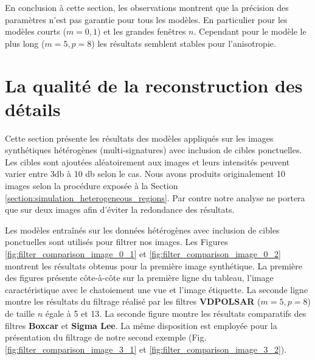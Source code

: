 En conclusion à cette section, les observations montrent que la précision des paramètres n'est pas garantie pour tous les modèles.  En particulier pour les modèles courts ($m=0,1$) et les grandes fenêtres $n$. Cependant pour le modèle le plus long ($m=5, p=8$) les résultats semblent stables pour l'anisotropie.  







\section{La qualité de la reconstruction des détails}

Cette section présente les résultats des modèles appliqués sur les images synthétiques hétérogènes (multi-signatures) avec inclusion de cibles ponctuelles. Les cibles sont ajoutées aléatoirement aux images et leurs intensités peuvent varier entre 3db à 10 db selon le cas.  Nous avons produits originalement 10 images selon la procédure exposée à la Section \ref{section:simulation_heterogeneous_regions}. Par contre notre analyse ne portera que sur deux images afin d'éviter la redondance des résultats.

Les modèles entraînés sur les données hétérogènes avec inclusion de cibles ponctuelles sont utilisés pour filtrer nos images.  Les Figures \ref{fig:filter_comparison_image_0_1} et \ref{fig:filter_comparison_image_0_2} montrent les résultats obtenus pour la première image synthétique. La première des figures présente côte-à-côte sur la première ligne du tableau, l'image caractéristique avec le chatoiement une vue et l'image étiquette.  La seconde ligne montre les résultats du filtrage réalisé par les filtres \textbf{VDPOLSAR} ($m=5, p=8$) de taille $n$ égale à 5 et 13.  La seconde figure  montre les résultats comparatifs des filtres \textbf{Boxcar} et \textbf{Sigma Lee}. La même disposition est employée pour la présentation du filtrage de notre second exemple (Fig. \ref{fig:filter_comparison_image_3_1} et \ref{fig:filter_comparison_image_3_2}). 

